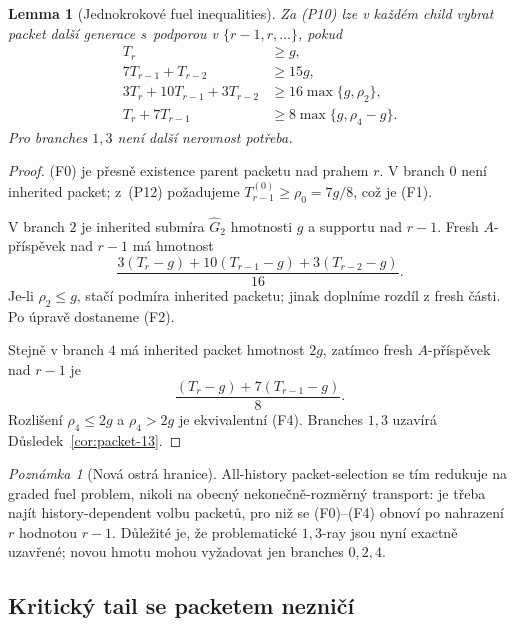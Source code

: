 \documentclass[11pt,a4paper]{article}
\newtheorem{lemma}[theorem]{Lemma}
\theoremstyle{definition}
\theoremstyle{remark}
\newtheorem{remark}[theorem]{Poznámka}
\begin{document}
\begin{lemma}[Jednokrokov\'e fuel inequalities]
\label{lem:fuel-ineq}
Za \textup{(P10)} lze v ka\v zd\'em child vybrat packet dal\v s\'i
generace s~podporou v \(\{r-1,r,\ldots\}\), pokud
\begin{align}
T_r&\ge g,\tag{F0}\\
7T_{r-1}+T_{r-2}&\ge15g,\tag{F1}\\
3T_r+10T_{r-1}+3T_{r-2}
&\ge16\max\{g,\rho_2\},\tag{F2}\\
T_r+7T_{r-1}
&\ge8\max\{g,\rho_4-g\}.
\tag{F4}
\end{align}
Pro branches \(1,3\) nen\'i dal\v s\'i nerovnost pot\v reba.
\end{lemma}

\begin{proof}
\textup{(F0)} je p\v resn\v e existence parent packetu nad prahem \(r\).
V branch \(0\) nen\'i inherited packet; z~\textup{(P12)} po\v zadujeme
\(T^{(0)}_{r-1}\ge\rho_0=7g/8\), co\v z je \textup{(F1)}.

V branch \(2\) je inherited subm\'ira \(\widehat G_2\) hmotnosti \(g\)
a supportu nad \(r-1\). Fresh \(A\)-p\v r\'isp\v evek nad \(r-1\) m\'a
hmotnost
\[
\frac{3(T_r-g)+10(T_{r-1}-g)+3(T_{r-2}-g)}{16}.
\]
Je-li \(\rho_2\le g\), sta\v c\'i podm\'ira inherited packetu; jinak
dopln\'ime rozd\'il z fresh \v c\'asti. Po \'uprav\v e dostaneme
\textup{(F2)}.

Stejn\v e v branch \(4\) m\'a inherited packet hmotnost \(2g\), zat\'imco
fresh \(A\)-p\v r\'isp\v evek nad \(r-1\) je
\[
\frac{(T_r-g)+7(T_{r-1}-g)}8.
\]
Rozli\v sen\'i \(\rho_4\le2g\) a \(\rho_4>2g\) je ekvivalentn\'i
\textup{(F4)}. Branches \(1,3\) uzav\'ir\'a
D\r usledek~\ref{cor:packet-13}.
\end{proof}

\begin{remark}[Nov\'a ostr\'a hranice]
All-history packet-selection se t\'im redukuje na graded fuel problem,
nikoli na obecn\'y nekone\v cn\v e-rozm\v ern\'y transport:
je t\v reba naj\'it history-dependent volbu packet\r u, pro ni\v z se
\textup{(F0)--(F4)} obnov\'i po nahrazen\'i \(r\) hodnotou \(r-1\).
D\r ule\v zit\'e je, \v ze problematick\'e \(1,3\)-ray jsou nyn\'i
exactn\v e uzav\v ren\'e; novou hmotu mohou vy\v zadovat jen branches
\(0,2,4\).
\end{remark}


\subsection{Kritick\'y tail se packetem nezni\v c\'i}
\end{document}
